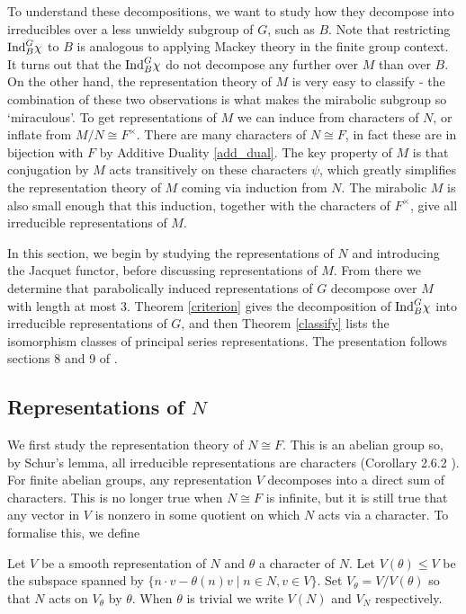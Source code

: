 To understand these decompositions, we want to study how they decompose into irreducibles over a less unwieldy subgroup of $G$, such as $B$. Note that restricting $\mathrm{Ind}_B^G \chi$ to $B$ is analogous to applying Mackey theory in the finite group context. It turns out that the $\mathrm{Ind}_B^G \chi$ do not decompose any further over $M$ than over $B$. On the other hand, the representation theory of $M$ is very easy to classify - the combination of these two observations is what makes the mirabolic subgroup so `miraculous'. To get representations of $M$ we can induce from characters of $N$, or inflate from $M/N\cong F^\times$. There are many characters of $N\cong F$, in fact these are in bijection with $F$ by Additive Duality \ref{add_dual}. The key property of $M$ is that conjugation by $M$ acts transitively on these characters $\psi$, which greatly simplifies the representation theory of $M$ coming via induction from $N$. The mirabolic $M$ is also small enough that this induction, together with the characters of $F^\times$, give all irreducible representations of $M$.

In this section, we begin by studying the representations of $N$ and introducing the Jacquet functor, before discussing representations of $M$. From there we determine that parabolically induced representations of $G$ decompose over $M$ with length at most 3. Theorem \ref{criterion} gives the decomposition of $\mathrm{Ind}_B^G \chi$ into irreducible representations of $G$, and then Theorem \ref{classify} lists the isomorphism classes of principal series representations. The presentation follows sections 8 and 9 of \cite{BH1}.

\subsection{Representations of \texorpdfstring{$N$}{TEXT}}

We first study the representation theory of $N \cong F$. This is an abelian group so, by Schur's lemma, all irreducible representations are characters (Corollary 2.6.2 \cite{BH1}). For finite abelian groups, any representation $V$ decomposes into a direct sum of characters. This is no longer true when $N\cong F$ is infinite, but it is still true that any vector in $V$ is nonzero in some quotient on which $N$ acts via a character. To formalise this, we define

\begin{notn}
    Let $V$ be a smooth representation of $N$ and $\theta$ a character of $N$. Let $V(\theta) \leq V$ be the subspace spanned by $\{n\cdot v - \theta(n)v \mid n \in N, v \in V\}$. Set $V_\theta = V/V(\theta)$ so that $N$ acts on $V_\theta$ by $\theta$. When $\theta$ is trivial we write $V(N)$ and $V_N$ respectively. 
\end{notn}

